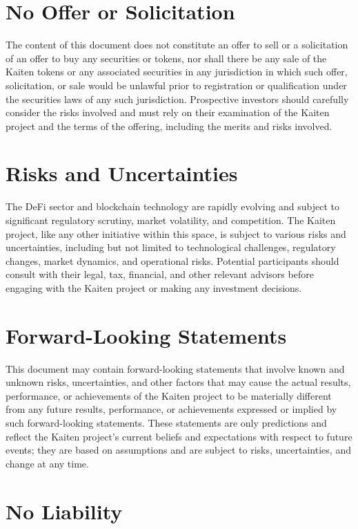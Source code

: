\documentclass[11pt,oneside,a4paper]{article}
\begin{document}
\section{No Offer or Solicitation}

The content of this document does not constitute an offer to sell or a solicitation of an offer to buy any securities or tokens, nor shall there be any sale of the Kaiten tokens or any associated securities in any jurisdiction in which such offer, solicitation, or sale would be unlawful prior to registration or qualification under the securities laws of any such jurisdiction. Prospective investors should carefully consider the risks involved and must rely on their examination of the Kaiten project and the terms of the offering, including the merits and risks involved.

\section{Risks and Uncertainties}

The DeFi sector and blockchain technology are rapidly evolving and subject to significant regulatory scrutiny, market volatility, and competition. The Kaiten project, like any other initiative within this space, is subject to various risks and uncertainties, including but not limited to technological challenges, regulatory changes, market dynamics, and operational risks. Potential participants should consult with their legal, tax, financial, and other relevant advisors before engaging with the Kaiten project or making any investment decisions.


\section{Forward-Looking Statements}

This document may contain forward-looking statements that involve known and unknown risks, uncertainties, and other factors that may cause the actual results, performance, or achievements of the Kaiten project to be materially different from any future results, performance, or achievements expressed or implied by such forward-looking statements. These statements are only predictions and reflect the Kaiten project's current beliefs and expectations with respect to future events; they are based on assumptions and are subject to risks, uncertainties, and change at any time.

\section{No Liability}
\end{document}
